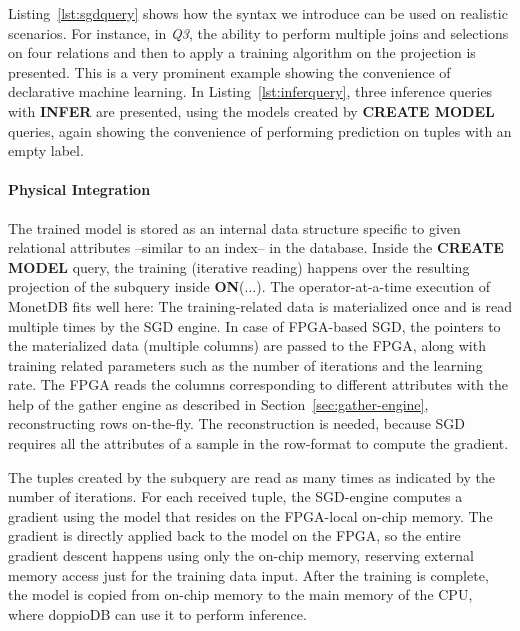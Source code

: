 \documentclass[11pt,dvipdfm]{article}
\begin{document}
Listing~\ref{lst:sgdquery} shows how the syntax we introduce can be used on realistic scenarios. For instance, in \emph{Q3}, the ability to perform multiple joins and selections on four relations and then to apply a training algorithm on the projection is presented. This is a very prominent example showing the convenience of declarative machine learning. In Listing~\ref{lst:inferquery}, three inference queries with \textbf{INFER} are presented, using the models created by \textbf{CREATE MODEL} queries, again showing the convenience of performing prediction on tuples with an empty label.


\vspace{-.5em}

\paragraph{\textbf{Physical Integration}} The trained model is stored as an internal data structure specific to given relational attributes --similar to an index-- in the database. Inside the \textbf{CREATE MODEL} query, the training (iterative reading) happens over the resulting projection of the subquery inside \textbf{ON}(...). The operator-at-a-time execution of MonetDB fits well here: The training-related data is materialized once and is read multiple times by the SGD engine. In case of FPGA-based SGD, the pointers to the materialized data (multiple columns) are passed to the FPGA, along with training related parameters such as the number of iterations and the learning rate. The FPGA reads the columns corresponding to different attributes with the help of the gather engine as described in Section~\ref{sec:gather-engine}, reconstructing rows on-the-fly. The reconstruction is needed, because SGD requires all the attributes of a sample in the row-format to compute the gradient.

The tuples created by the subquery are read as many times as indicated by the number of iterations. For each received tuple, the SGD-engine computes a gradient using the model that resides on the FPGA-local on-chip memory. The gradient is directly applied back to the model on the FPGA, so the entire gradient descent happens using only the on-chip memory, reserving external memory access just for the training data input. After the training is complete, the model is copied from on-chip memory to the main memory of the CPU, where doppioDB can use it to perform inference.


\vspace{-.5em}
\end{document}
